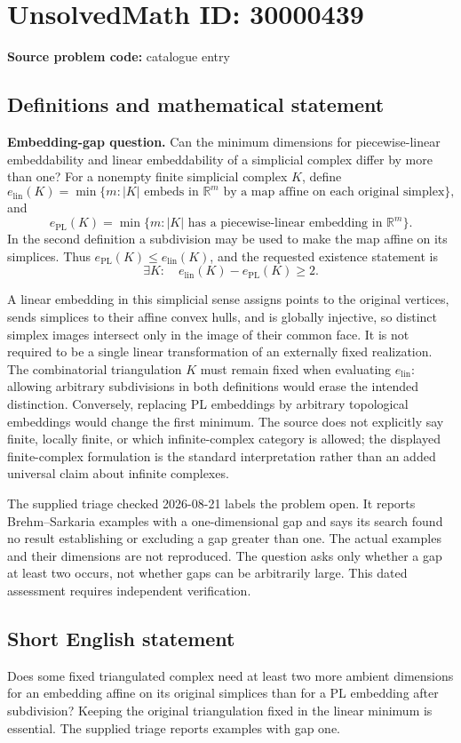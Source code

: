 \documentclass[11pt]{article}
\newcommand{\R}{\mathbb{R}}
\begin{document}
\section*{UnsolvedMath ID: 30000439}
\textbf{Source problem code:} catalogue entry
\subsection{Definitions and mathematical statement}
\textbf{Embedding-gap question.} Can the minimum dimensions for piecewise-linear embeddability and linear embeddability of a simplicial complex differ by more than one? For a nonempty finite simplicial complex \(K\), define\[e_{\mathrm{lin}}(K)=\min\{m:|K|\text{ embeds in }\R^m\text{ by a map affine on each original simplex}\},\] and\[e_{\mathrm{PL}}(K)=\min\{m:|K|\text{ has a piecewise-linear embedding in }\R^m\}.\] In the second definition a subdivision may be used to make the map affine on its simplices. Thus \(e_{\mathrm{PL}}(K)\le e_{\mathrm{lin}}(K)\), and the requested existence statement is\[\exists K:\quad e_{\mathrm{lin}}(K)-e_{\mathrm{PL}}(K)\ge2.\]\par A linear embedding in this simplicial sense assigns points to the original vertices, sends simplices to their affine convex hulls, and is globally injective, so distinct simplex images intersect only in the image of their common face. It is not required to be a single linear transformation of an externally fixed realization. The combinatorial triangulation \(K\) must remain fixed when evaluating \(e_{\mathrm{lin}}\): allowing arbitrary subdivisions in both definitions would erase the intended distinction. Conversely, replacing PL embeddings by arbitrary topological embeddings would change the first minimum. The source does not explicitly say finite, locally finite, or which infinite-complex category is allowed; the displayed finite-complex formulation is the standard interpretation rather than an added universal claim about infinite complexes.\par The supplied triage checked 2026-08-21 labels the problem open. It reports Brehm--Sarkaria examples with a one-dimensional gap and says its search found no result establishing or excluding a gap greater than one. The actual examples and their dimensions are not reproduced. The question asks only whether a gap at least two occurs, not whether gaps can be arbitrarily large. This dated assessment requires independent verification.
\subsection{Short English statement}
Does some fixed triangulated complex need at least two more ambient dimensions for an embedding affine on its original simplices than for a PL embedding after subdivision? Keeping the original triangulation fixed in the linear minimum is essential. The supplied triage reports examples with gap one.
\end{document}
